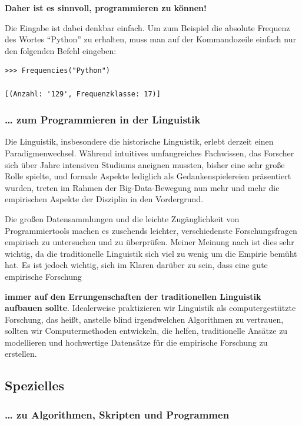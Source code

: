 \par\noindent\textbf{Daher ist es sinnvoll, programmieren zu können!}

Die Eingabe ist dabei denkbar einfach. Um zum Beispiel die absolute
Frequenz des Wortes ``Python'' zu erhalten, muss man auf der
Kommandozeile einfach nur den folgenden Befehl eingeben:

\begin{verbatim}
>>> Frequencies("Python")

[(Anzahl: '129', Frequenzklasse: 17)]
\end{verbatim}


\subsubsection{\texorpdfstring{{\ldots{} zum Programmieren in der
Linguistik}}{\ldots{} zum Programmieren in der Linguistik}}

{ Die Linguistik, insbesondere die historische Linguistik, erlebt
derzeit einen Paradigmenwechsel. Während intuitives umfangreiches
Fachwissen, das Forscher sich über Jahre intensiven Studiums aneignen
mussten, bisher eine sehr große Rolle spielte, und formale Aspekte
lediglich als Gedankenspielereien präsentiert wurden, treten im Rahmen
der Big-Data-Bewegung nun mehr und mehr die empirischen Aspekte der
Disziplin in den Vordergrund. }



Die großen Datensammlungen und die leichte Zugänglichkeit von
Programmiertools machen es zusehends leichter, verschiedenste
Forschungsfragen empirisch zu untersuchen und zu überprüfen. Meiner
Meinung nach ist dies sehr wichtig, da die traditionelle Linguistik sich
viel zu wenig um die Empirie bemüht hat. Es ist jedoch wichtig, sich im
Klaren darüber zu sein, dass eine gute empirische Forschung
\par\noindent\textbf{immer auf den Errungenschaften der traditionellen Linguistik
aufbauen sollte}. Idealerweise praktizieren wir Linguistik als
{computergestützte Forschung}, das heißt, anstelle blind irgendwelchen
Algorithmen zu vertrauen, sollten wir Computermethoden entwickeln, die
helfen, traditionelle Ansätze zu modellieren und hochwertige Datensätze
für die empirische Forschung zu erstellen.

\subsection{Spezielles}

\subsubsection{\texorpdfstring{{\ldots{} zu Algorithmen, Skripten und
Programmen}}{\ldots{} zu Algorithmen, Skripten und Programmen}}

